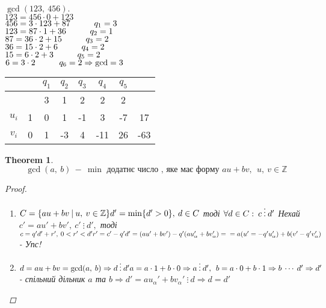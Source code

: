 \documentclass[a4paper,12pt]{bookest}
\newtheorem{theorem}{Theorem}[section]
\DeclareMathOperator{\blank}{ }
\newcommand\tab[1][1cm]{\hspace*{#1}}
\begin{document}
\begin{example}
	$\gcd(123,\>456).$\\
	$123=456\cdot 0+123$\\
	$456=3\cdot 123+87\tab q_1=3$\\
	$123=87\cdot 1+36\tab q_2=1$\\
	$87=36\cdot 2+15\tab q_3=2$\\
	$36=15\cdot 2+6\tab q_4=2$\\
	$15=6\cdot 2+3\tab q_5=2$\\
	$6=3\cdot2\tab q_6=2\Rightarrow \gcd = 3\\$
	\begin{center}
	\begin{tabular}{ |c|c|c|c|c|c|c|c| } 
 		\hline
 		$\blank$ & $\blank$ & $q_1$ & $q_2$ & $q_3$ & $q_4$ & $q_5$ & $\blank$\\ \hline
 		$\blank$ & $\blank$ & 3 & 1 & 2 & 2 & 2 & $\blank$\\ \hline
 		$u_i$ & 1 & 0 & 1 & -1 & 3 & -7 & 17\\ \hline
 		$v_i$ & 0 & 1 & -3 & 4 & -11 & 26 & -63\\ 
 		\hline
	\end{tabular}
	\end{center}
\end{example}
\begin{theorem}
	$$\gcd(a,\>b)\>-\>\min\textrm{ додатнє число , яке має форму } au+bv,\>\>u,\>v\in\mathbb{Z}$$
	\begin{proof}$ $
		\begin{enumerate}
  \item $C=\{au+bv\>|\>u,\>v\in\mathbb{Z}\}\\ d'=\min\{d'>0\},\>d\in C$ тоді $\forall d\in C:\>c\>\vdots\>d'\\$ Нехай $c'=au'+bv',\>c'\>\vdots\>d',$ тоді $c=q'd'+r',\>0<r'<d'\\r'=c'-q'd'=(au'+bv')-q'(au'_\alpha+bv'_\alpha)=\\=a(u'=-q'u'_\alpha)+b(v'-q'v'_\alpha)$ - Упс!
  \item $d=au+bv=\gcd(a,\>b)\Rightarrow d\>\vdots\>d'\\a=a\cdot1+b\cdot0\Rightarrow a\>\vdots\>d',\>\>b=a\cdot0+b\cdot1\Rightarrow b\>\cdots\>d'\\\Rightarrow d'$ - спільний дільник $a$ та  $b\Rightarrow d'=au_\alpha'+bv_\alpha'\>\vdots\>d\Rightarrow d=d'$
		\end{enumerate}
	\end{proof}
\end{theorem}
\end{document}
